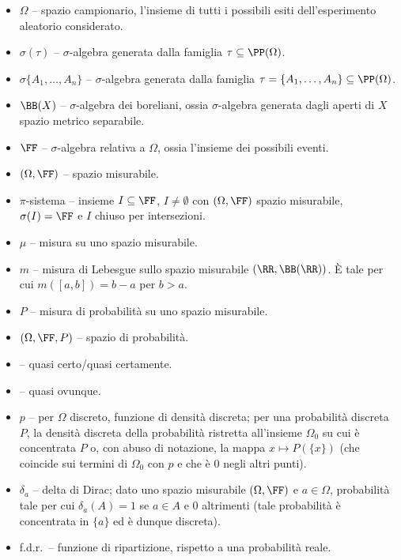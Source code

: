 \begin{multicols*}{2}
    \begin{itemize}
        \item $\Omega$ -- spazio campionario, l'insieme di tutti i possibili esiti dell'esperimento aleatorio considerato.
        \item $\sigma(\tau)$ -- $\sigma$-algebra generata dalla famiglia $\tau \subseteq \PP(\Omega)$.
        \item $\sigma\{A_1, \ldots, A_n\}$ -- $\sigma$-algebra generata dalla famiglia
        $\tau = \{A_1, \ldots, A_n\} \subseteq \PP(\Omega)$.
        \item $\BB(X)$ -- $\sigma$-algebra dei boreliani, ossia $\sigma$-algebra generata dagli aperti di $X$ spazio metrico separabile.
        \item $\FF$ -- $\sigma$-algebra relativa a $\Omega$, ossia l'insieme dei possibili eventi.
        \item $(\Omega, \FF)$ -- spazio misurabile.
        \item $\pi$-sistema -- insieme $I \subseteq \FF$, $I \neq \emptyset$ con $(\Omega, \FF)$ spazio misurabile, $\sigma(I) = \FF$ e $I$ chiuso per intersezioni.
        \item $\mu$ -- misura su uno spazio misurabile.
        \item $m$ -- misura di Lebesgue sullo spazio misurabile $(\RR, \BB(\RR))$. È tale per cui $m([a, b]) = b-a$ per $b > a$.
        \item $P$ -- misura di probabilità su uno spazio misurabile.
        \item $(\Omega, \FF, P)$ -- spazio di probabilità.
        \item \qc -- quasi certo/quasi certamente.
        \item \qo -- quasi ovunque.
        \item $p$ -- per $\Omega$ discreto, funzione di densità discreta; per una probabilità discreta $P$, la densità discreta della probabilità
        ristretta all'insieme $\Omega_0$ su cui è concentrata $P$ o, con abuso di notazione, la mappa $x \mapsto P(\{x\})$ (che coincide
        sui termini di $\Omega_0$ con $p$ e che è $0$ negli altri punti).
        \item $\delta_a$ -- delta di Dirac; dato uno spazio misurabile $(\Omega, \FF)$ e $a \in \Omega$, probabilità tale per cui
        $\delta_a(A) = 1$ se $a \in A$ e $0$ altrimenti (tale probabilità è concentrata in $\{a\}$ ed è dunque
        discreta).
        \item f.d.r.~-- funzione di ripartizione, rispetto a una probabilità reale.

\end{itemize}
\end{multicols*}

